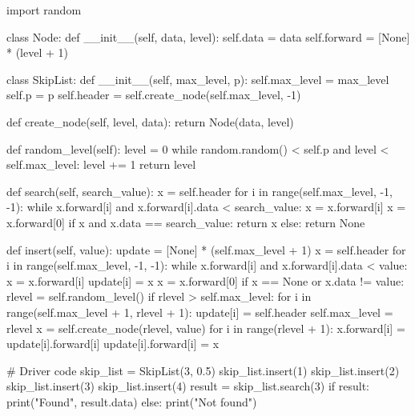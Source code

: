 import random

class Node:
    def __init__(self, data, level):
        self.data = data
        self.forward = [None] * (level + 1)

class SkipList:
    def __init__(self, max_level, p):
        self.max_level = max_level
        self.p = p
        self.header = self.create_node(self.max_level, -1)

    def create_node(self, level, data):
        return Node(data, level)

    def random_level(self):
        level = 0
        while random.random() < self.p and level < self.max_level:
            level += 1
        return level

    def search(self, search_value):
        x = self.header
        for i in range(self.max_level, -1, -1):
            while x.forward[i] and x.forward[i].data < search_value:
                x = x.forward[i]
        x = x.forward[0]
        if x and x.data == search_value:
            return x
        else:
            return None

    def insert(self, value):
        update = [None] * (self.max_level + 1)
        x = self.header
        for i in range(self.max_level, -1, -1):
            while x.forward[i] and x.forward[i].data < value:
                x = x.forward[i]
            update[i] = x
        x = x.forward[0]
        if x == None or x.data != value:
            rlevel = self.random_level()
            if rlevel > self.max_level:
                for i in range(self.max_level + 1, rlevel + 1):
                    update[i] = self.header
                self.max_level = rlevel
            x = self.create_node(rlevel, value)
            for i in range(rlevel + 1):
                x.forward[i] = update[i].forward[i]
                update[i].forward[i] = x

# Driver code
skip_list = SkipList(3, 0.5)
skip_list.insert(1)
skip_list.insert(2)
skip_list.insert(3)
skip_list.insert(4)
result = skip_list.search(3)
if result:
    print("Found", result.data)
else:
    print("Not found")
